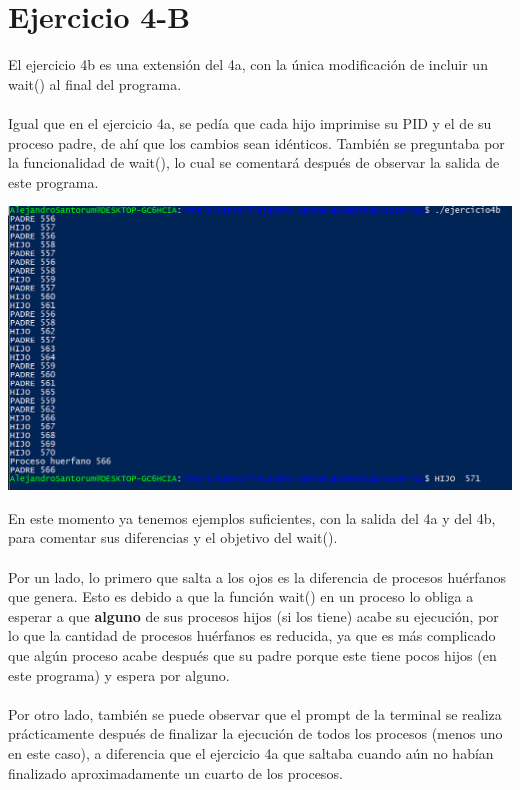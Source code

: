 \documentclass[12pt]{article}
\begin{document}
\section{Ejercicio 4-B}
El ejercicio 4b es una extensión del 4a, con la única modificación de incluir un wait() al final del programa.\\\\
Igual que en el ejercicio 4a, se pedía que cada hijo imprimise su PID y el de su proceso padre, de ahí que los cambios sean idénticos. También se preguntaba por la funcionalidad de wait(), lo cual se comentará después de observar la salida de este programa.
\begin{center}
	\includegraphics[scale=0.9]{ej4b.PNG}
\end{center}
En este momento ya tenemos ejemplos suficientes, con la salida del 4a y del 4b, para comentar sus diferencias y el objetivo del wait().\\\\
Por un lado, lo primero que salta a los ojos es la diferencia de procesos huérfanos que genera. Esto es debido a que la función wait() en un proceso lo obliga a esperar a que \textbf{alguno} de sus procesos hijos (si los tiene) acabe su ejecución, por lo que la cantidad de procesos huérfanos es reducida, ya que es más complicado que algún proceso acabe después que su padre porque este tiene pocos hijos (en este programa) y espera por alguno.\\\\
Por otro lado, también se puede observar que el prompt de la terminal se realiza prácticamente después de finalizar la ejecución de todos los procesos (menos uno en este caso), a diferencia que el ejercicio 4a que saltaba cuando aún no habían finalizado aproximadamente un cuarto de los procesos.\\\\
\end{document}
